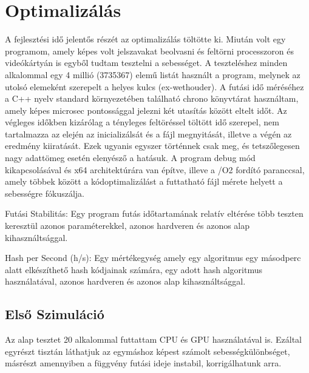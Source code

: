 \section{Optimalizálás}


A fejlesztési idő jelentős részét az optimalizálás töltötte ki. Miután volt egy programom, amely képes volt jelszavakat beolvasni és feltörni processzoron és videókártyán is egyből tudtam tesztelni a sebességet. A teszteléshez minden alkalommal egy 4 millió (\num{3735367}) elemű listát használt a program, melynek az utolsó elemeként szerepelt a helyes kulcs (ex-wethouder).
A futási idő méréséhez a C++ nyelv standard környezetében található chrono könyvtárat használtam, amely képes microsec pontossággal jelezni két utasítás között eltelt időt. Az végleges időkben kizárólag a tényleges feltöréssel töltött idő szerepel, nem tartalmazza az elején az inicializálsát és a fájl megnyitását, illetve a végén az eredmény kiiratását. Ezek ugyanis egyszer történnek csak meg, és tetszőlegesen nagy adattömeg esetén elenyésző a hatásuk.
A program debug mód kikapcsolásával és x64 architektúrára van építve, illeve a /O2 fordító paranccsal, amely többek között a kódoptimalizálást a futtatható fájl mérete helyett a sebességre fókuszálja.


\begin{definition}
Futási Stabilitás: Egy program futás időtartamának relatív eltérése több teszten keresztül azonos paraméterekkel, azonos hardveren és azonos alap kihasználtsággal.
\end{definition}

\begin{definition}
Hash per Second (h/s): Egy mértékegység amely egy algoritmus egy másodperc alatt elkészíthető hash kódjainak számára, egy adott hash algoritmus használatával, azonos hardveren és azonos alap kihasználtsággal.
\end{definition}




\subsection{Első Szimuláció}




Az alap tesztet 20 alkalommal futtattam CPU és GPU használatával is. Ezáltal egyrészt tisztán láthatjuk az egymáshoz képest számolt sebességkülönbséget, másrészt amennyiben a függvény futási ideje instabil, korrigálhatunk arra.


